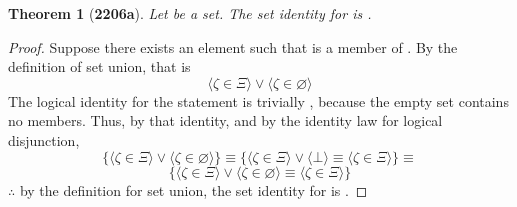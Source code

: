 \documentclass[preview]{standalone}
\newtheorem*{theorem*}{Theorem}
\begin{document}
\begin{theorem*}[\textbf{2206a}] \color{black}
    Let \bm{$\Xi$} be a set. 
    The set identity for \bm{$\Xi$} is \bm{$\Xi \cup \varnothing = \Xi$}.
\end{theorem*}
\begin{proof} \color{black}
    Suppose there exists an element \bm{$\zeta$} such that \bm{$\zeta$} is a member of 
    \bm{$\Xi \cup \varnothing$}. 
    By the definition of set union, that is 
    \begin{equation*}
        \Big \langle \zeta \in \Xi \Big \rangle 
            \lor 
        \Big \langle \zeta \in \varnothing \Big \rangle
    \end{equation*}
    The logical identity for the statement \bm{$\zeta \in \varnothing$} is trivially \bm{$\bot$}, 
    because the empty set contains no members. 
    Thus, by that identity, and by the identity law for logical disjunction,
    \begin{equation*} 
        \Bigg\{
            \Big \langle \zeta \in \Xi \Big \rangle 
                \lor 
            \Big \langle \zeta \in \varnothing \Big \rangle
        \Bigg\} 
            \equiv
        \Bigg\{
            \Big \langle \zeta \in \Xi \Big \rangle 
                \lor
            \Big \langle \bot \Big \rangle 
                \equiv
            \Big \langle \zeta \in \Xi \Big \rangle
        \Bigg\}
            \equiv
    \end{equation*}
    \begin{equation*} 
        \Bigg\{
            \Big \langle \zeta \in \Xi \Big \rangle 
                \lor 
            \Big \langle \zeta \in \varnothing \Big \rangle
                \equiv
            \Big \langle \zeta \in \Xi \Big \rangle
        \Bigg\}
    \end{equation*}
    $\therefore$ 
    by the definition for set union,
    the set identity for \bm{$\Xi$} is \bm{$\Xi \cup \varnothing = \Xi$}.
\color{lightgray} \end{proof}
\end{document}

